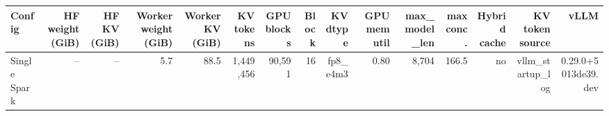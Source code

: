 \begin{tabular}{l r r r r r r r r r r r r r r }
\toprule
Config & HF weight (GiB) & HF KV (GiB) & Worker weight (GiB) & Worker KV (GiB) & KV tokens & GPU blocks & Block & KV dtype & GPU mem util & max\_model\_len & max conc. & Hybrid cache & KV token source & vLLM \\
\midrule
Single Spark & -- & -- & 5.7 & 88.5 & 1,449,456 & 90,591 & 16 & fp8\_e4m3 & 0.80 & 8,704 & 166.5 & no & vllm\_startup\_log & 0.29.0+5013de39.dev \\
\bottomrule
\end{tabular}
